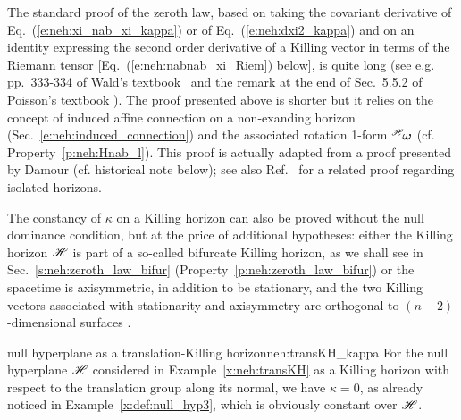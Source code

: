 \begin{remark}
\label{r:neh:proof_zeroth_law}
The standard proof of the zeroth law, based on taking the covariant derivative
of Eq.~(\ref{e:neh:xi_nab_xi_kappa}) \cite{BardeCH73,Carte87,Wald84} or of Eq.~(\ref{e:neh:dxi2_kappa})
\cite{Heusl96} and on an identity expressing the second order derivative of
a Killing vector in terms of the Riemann tensor [Eq.~(\ref{e:neh:nabnab_xi_Riem}) below], is quite long (see
e.g. pp.~333-334 of Wald's textbook~\cite{Wald84} and the remark at the end of Sec.~5.5.2 of Poisson's
textbook \cite{Poiss04}). The proof presented above is shorter but it relies on
the concept of induced affine connection on a non-exanding horizon
(Sec.~\ref{e:neh:induced_connection}) and the associated rotation
1-form ${}^{\mathscr{H}}\!\bm{\omega}$ (cf.
Property~\ref{p:neh:Hnab_l}). This proof is actually adapted from a proof
presented by Damour \cite{Damou79,Damou82} (cf. historical note below); see
also Ref.~\cite{AshteBL01} for a related proof regarding isolated horizons.
\end{remark}

\begin{remark}
\label{r:neh:zero_law_wo_NDEC}
The constancy of $\kappa$ on a Killing horizon can also be proved without the
null dominance condition, but at the price of additional hypotheses:
either the Killing horizon $\mathscr{H}$ is part of a so-called bifurcate Killing horizon,
as we shall see in Sec.~\ref{s:neh:zeroth_law_bifur} (Property~\ref{p:neh:zeroth_law_bifur})
or the spacetime is axisymmetric, in addition to be stationary, and
the two Killing vectors associated
with stationarity and
axisymmetry are orthogonal to $(n-2)$-dimensional
surfaces \cite{Carte73b,RaczW96}.
\end{remark}

\begin{texample}{null hyperplane as a translation-Killing horizon}{neh:transKH_kappa}
For the null hyperplane $\mathscr{H}$ considered in Example~\ref{x:neh:transKH} as a Killing horizon with respect to the translation group along its normal, we have
$\kappa = 0$, as already noticed in Example~\ref{x:def:null_hyp3},
which is obviously constant over $\mathscr{H}$.
\end{texample}

